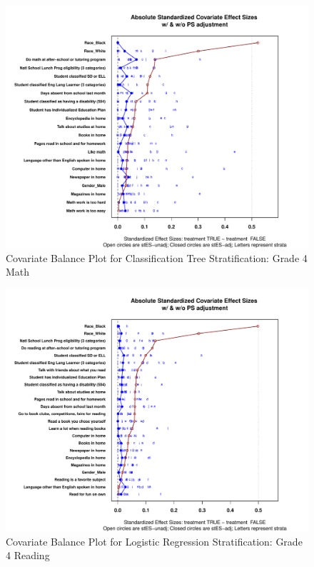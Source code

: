 \documentclass[letterpaper,12p,twoside]{article} %
\begin{document}
\begin{figure}
\begin{center}
\includegraphics[width=\textwidth]{../Figures2009/g4math-tree-balance.pdf}
\caption{Covariate Balance Plot for Classification Tree Stratification: Grade 4 Math}
\end{center}
\end{figure}

\begin{figure}
\begin{center}
\includegraphics[width=\textwidth]{../Figures2009/g4read-lr-balance.pdf}
\caption{Covariate Balance Plot for Logistic Regression Stratification: Grade 4 Reading}
\end{center}
\end{figure}
\end{document}
